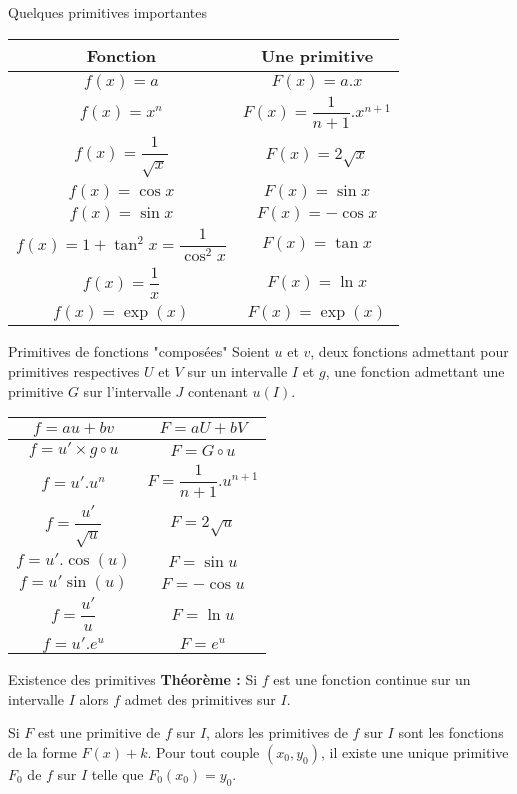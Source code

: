 \begin{bclogo}{Quelques primitives importantes}

\begin{center}
\begin{tabular}{|c|c|}
\hline
Fonction&Une primitive\\
\hline
$f(x)=a$&$F(x)=a.x$\\
\hline
$f(x)=x^n$&$F(x)=\dfrac{1}{n+1}.x^{n+1}$\\
\hline
$f(x)=\dfrac{1}{\sqrt{x}}$&$F(x)=2\sqrt{x}$\\
\hline
$f(x)=\cos x$&$F(x)=\sin x$\\
\hline
$f(x)=\sin x$&$F(x)=-\cos x$\\
\hline
$f(x)=1+\tan ^2 x=\dfrac{1}{\cos ^2x}$&$F(x)=\tan x$\\
\hline
$f(x)=\dfrac{1}{x}$&$F(x)=\ln x$\\
\hline
$f(x)=\exp (x)$&$F(x)=\exp (x)$\\
\hline
\end{tabular}
\end{center}
\end{bclogo}

\medskip

\begin{bclogo}{Primitives de fonctions "composées"}
Soient $u$ et $v$, deux fonctions admettant pour primitives respectives $U$ et $V$ sur un intervalle $I$ et $g$, une fonction admettant une primitive $G$ sur l'intervalle $J$ contenant $u(I)$.

\begin{center}
\begin{tabular}{|c|c|}
\hline
$f=au+bv$&$F=aU+bV$\\
\hline
$f=u'\times g\circ u$&$F=G\circ u$\\
\hline
$f=u'.u^n$&$F=\dfrac{1}{n+1}.u^{n+1}$\\
\hline
$f=\dfrac{u'}{\sqrt{u}}$&$F=2\sqrt{u}$\\
\hline
$f=u'.\cos (u)$&$F=\sin u$\\
\hline
$f=u' \sin (u)$&$F=-\cos u$\\
\hline
$f=\dfrac{u'}{u}$&$F=\ln u$\\
\hline
$f=u'.e^{u}$&$F=e^{u}$\\
\hline
\end{tabular} 
\end{center}
\end{bclogo}

\medskip

\begin{bclogo}{Existence des primitives}
\textbf{Théorème :} Si $f$ est une fonction continue sur un intervalle $I$ alors $f$ admet des primitives sur $I$.

Si $F$ est une primitive de $f$ sur $I$, alors les primitives de $f$ sur $I$ sont les fonctions de la forme $F(x)+k$. Pour tout couple $(x_0,y_0)$, il existe une unique primitive $F_0$ de $f$ sur $I$ telle que $F_0(x_0)=y_0$.
\end{bclogo}

